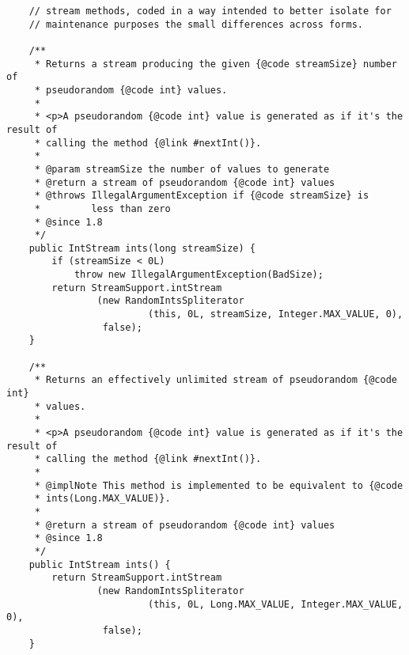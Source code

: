 \documentclass[12pt,a4paper,twoside,openright,titlepage,final]{article}
\begin{document}
\begin{verbatim}
    // stream methods, coded in a way intended to better isolate for
    // maintenance purposes the small differences across forms.

    /**
     * Returns a stream producing the given {@code streamSize} number of
     * pseudorandom {@code int} values.
     *
     * <p>A pseudorandom {@code int} value is generated as if it's the result of
     * calling the method {@link #nextInt()}.
     *
     * @param streamSize the number of values to generate
     * @return a stream of pseudorandom {@code int} values
     * @throws IllegalArgumentException if {@code streamSize} is
     *         less than zero
     * @since 1.8
     */
    public IntStream ints(long streamSize) {
        if (streamSize < 0L)
            throw new IllegalArgumentException(BadSize);
        return StreamSupport.intStream
                (new RandomIntsSpliterator
                         (this, 0L, streamSize, Integer.MAX_VALUE, 0),
                 false);
    }

    /**
     * Returns an effectively unlimited stream of pseudorandom {@code int}
     * values.
     *
     * <p>A pseudorandom {@code int} value is generated as if it's the result of
     * calling the method {@link #nextInt()}.
     *
     * @implNote This method is implemented to be equivalent to {@code
     * ints(Long.MAX_VALUE)}.
     *
     * @return a stream of pseudorandom {@code int} values
     * @since 1.8
     */
    public IntStream ints() {
        return StreamSupport.intStream
                (new RandomIntsSpliterator
                         (this, 0L, Long.MAX_VALUE, Integer.MAX_VALUE, 0),
                 false);
    }


\end{verbatim}
\end{document}
